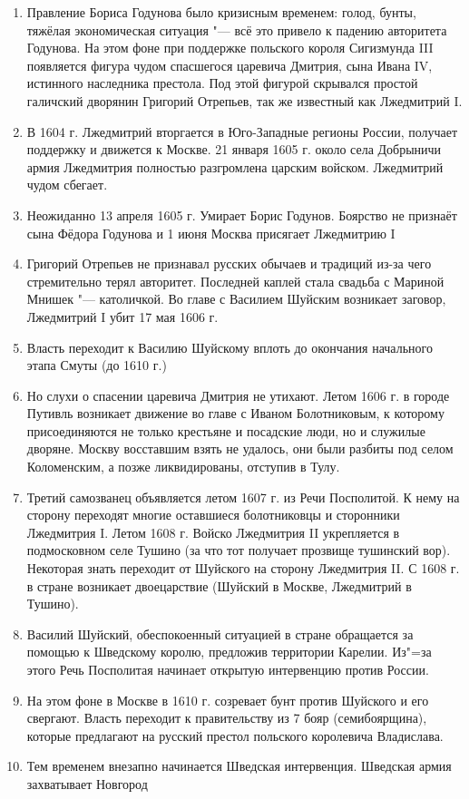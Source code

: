 \begin{enumerate}
    \item{ Правление Бориса Годунова было кризисным временем: голод, бунты, тяжёлая экономическая ситуация "--- всё это привело к падению авторитета Годунова. На этом фоне при поддержке польского короля Сигизмунда III появляется фигура чудом спасшегося царевича Дмитрия, сына Ивана IV, истинного наследника престола. Под этой фигурой скрывался простой галичский дворянин Григорий Отрепьев, так же известный как Лжедмитрий I.  }
    \item{ В 1604 г. Лжедмитрий вторгается в Юго-Западные регионы России, получает поддержку и движется к Москве. 21 января 1605 г. около села Добрыничи армия Лжедмитрия полностью разгромлена царским войском. Лжедмитрий чудом сбегает. }
    \item{ Неожиданно 13 апреля 1605 г. Умирает Борис Годунов. Боярство не признаёт сына Фёдора Годунова и 1 июня Москва присягает Лжедмитрию I }
    \item{ Григорий Отрепьев не признавал русских обычаев и традиций из-за чего стремительно терял авторитет. Последней каплей стала свадьба с Мариной Мнишек "--- католичкой. Во главе с Василием Шуйским возникает заговор, Лжедмитрий I убит 17 мая 1606 г. }
    \item{ Власть переходит к Василию Шуйскому вплоть до окончания начального этапа Смуты (до 1610 г.) }
    \item{ Но слухи о спасении царевича Дмитрия не утихают. Летом 1606 г. в городе Путивль возникает движение во главе с Иваном Болотниковым, к которому присоединяются не только крестьяне и посадские люди, но и служилые дворяне. Москву восставшим взять не удалось, они были разбиты под селом Коломенским, а позже ликвидированы, отступив в Тулу. }
    \item{ Третий самозванец объявляется летом 1607 г. из Речи Посполитой. К нему на сторону переходят многие оставшиеся болотниковцы и сторонники Лжедмитрия I. Летом 1608 г. Войско Лжедмитрия II укрепляется в подмосковном селе Тушино (за что тот получает прозвище тушинский вор). Некоторая знать переходит от Шуйского на сторону Лжедмитрия II. С 1608 г. в стране возникает двоецарствие (Шуйский в Москве, Лжедмитрий в Тушино). }
    \item{ Василий Шуйский, обеспокоенный ситуацией в стране обращается за помощью к Шведскому королю, предложив территории Карелии. Из"=за этого Речь Посполитая начинает открытую интервенцию против России. }
    \item{ На этом фоне в Москве в 1610 г. созревает бунт против Шуйского и его свергают. Власть переходит к правительству из 7 бояр (семибоярщина), которые предлагают на русский престол польского королевича Владислава.  }
    \item{ Тем временем внезапно начинается Шведская интервенция. Шведская армия захватывает Новгород }
\end{enumerate} 
